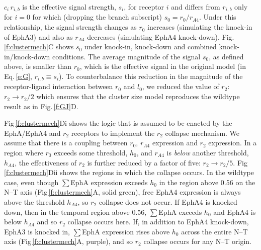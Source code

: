\documentclass[11pt, a4paper]{article}
\begin{document}
$c_i\,r_{i,b}$ is the effective signal strength, $s_i$, for receptor $i$ and differs from $r_{i,b}$ only for $i=0$ for which (dropping the branch subscript) $s_0 = r_0/r_{\!\scriptscriptstyle A4}$.
Under this relationship, the signal strength changes as $r_0$ increases (simulating the knock-in of EphA3) and also as $r_{\!\scriptscriptstyle A4}$ decreases (simulating EphA4 knock-down).  
Fig.\,\ref{f:clustermech}C shows $s_0$ under knock-in, knock-down and combined knock-in/knock-down conditions.
The average magnitude of the signal $s_0$, as defined above, is smaller than $r_0$, which is the effective signal in the original model (in Eq.\,\ref{e:G}, $r_{i,b} \equiv s_i$). To counterbalance this reduction in the magnitude of the receptor-ligand interaction between $r_0$ and $l_0$, we reduced the value of $r_2$: $r_2 \rightarrow r_2/2$ which ensures that the cluster size model reproduces the wildtype result as in Fig.\,\ref{f:GJ}D.

Fig\,\ref{f:clustermech}Di shows the logic that is assumed to be enacted by the EphA/EphA4 and $r_2$ receptors to implement the $r_2$ collapse mechanism. We assume that there is a coupling between $r_0$, $r_{A4}$ expression and $r_2$ expression. In a region where $r_0$ exceeds some threshold, $h_0$, and $r_{A4}$ is \emph{below} another threshold, $h_{A4}$, the effectiveness of $r_2$ is further reduced by a factor of five: $r_2 \rightarrow r_2/5$.
Fig\,\ref{f:clustermech}Dii shows the regions in which the collapse occurs.
In the wildtype case, even though $\sum$EphA expression exceeds $h_0$ in the region above 0.56 on the N--T axis (Fig\,\ref{f:clustermech}A, solid green), free EphA4 expression is always above the threshold $h_{A4}$, so $r_2$ collapse does not occur.
If EphA4 is knocked down, then in the temporal region above 0.56, $\sum$EphA exceeds $h_0$ and EphA4 is below $h_{A4}$ and so $r_2$ collapse occurs here.
If, in addition to EphA4 knock-down, EphA3 is knocked in, $\sum$EphA expression rises above $h_0$ across the entire N--T axis (Fig\,\ref{f:clustermech}A, purple), and so $r_2$ collapse occurs for any N--T origin.
\end{document}
